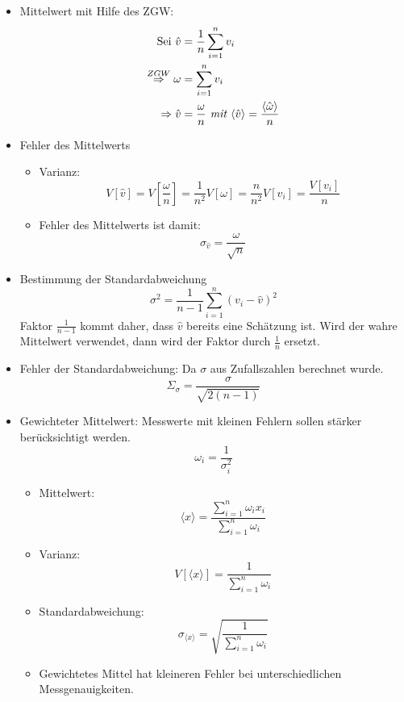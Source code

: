 \documentclass[10pt,a4paper]{article}
\begin{document}
\begin{itemize}
\item Mittelwert mit Hilfe des ZGW: 
\begin{align}
\text{Sei } \hat{v}&=\frac{1}{n} \sum^{n}_{i=1}{v_i} \notag \\
\stackrel{ZGW}{\Rightarrow} \omega&=\sum^{n}_{i=1}{v_i} \notag \\
\Rightarrow \hat{v}&=\frac{\omega}{n} \textit{ mit } \langle \hat{v} \rangle = \frac{\langle \hat{\omega} \rangle}{n}
\end{align} 
\item Fehler des Mittelwerts
\begin{itemize}
\item Varianz:
\begin{equation}
V[\hat{v}]=V[\frac{\omega}{n}]=\frac{1}{n^2}V[\omega]=\frac{n}{n^2}V[v_i]=\frac{V[v_i]}{n}
\end{equation}
\item Fehler des Mittelwerts ist damit:
\begin{equation}
\sigma_{\hat{v}}=\frac{\omega}{\sqrt{n}}
\end{equation}
\end{itemize}
\item Bestimmung der Standardabweichung
\begin{equation}
\sigma^2=\frac{1}{n-1}\sum^{n}_{i=1}{(v_i-\hat{v})^2}
\end{equation}
Faktor $\frac{1}{n-1}$ kommt daher, dass $\hat{v}$ bereits eine Schätzung ist. Wird der wahre Mittelwert verwendet, dann wird der Faktor durch $\frac{1}{n}$ ersetzt.
\item Fehler der Standardabweichung: Da $\sigma$ aus Zufallszahlen berechnet wurde.
\begin{equation}
\Sigma_{\sigma}=\frac{\sigma}{\sqrt{2(n-1)}}
\end{equation}
\item Gewichteter Mittelwert: \newline
Messwerte mit kleinen Fehlern sollen stärker berücksichtigt werden.
\begin{equation}
\omega_i=\frac{1}{\sigma^2_i}
\end{equation}
\begin{itemize}
\item Mittelwert:
	\begin{equation}
		\langle x \rangle = \frac{\sum^{n}_{i=1}{\omega_i x_i}}{\sum^{n}_{i=1}\omega_i}
	\end{equation} 
\item Varianz:
	\begin{equation}
		V[\langle x \rangle]=\frac{1}{\sum^{n}_{i=1}\omega_i}
	\end{equation}
\item Standardabweichung:
	\begin{equation}
		\sigma_{\langle x \rangle} = \sqrt{\frac{1}{\sum^{n}_{i=1}\omega_i}}
	\end{equation}
\item Gewichtetes Mittel hat kleineren Fehler bei unterschiedlichen Messgenauigkeiten.
\end{itemize}
\end{itemize}
\end{document}
